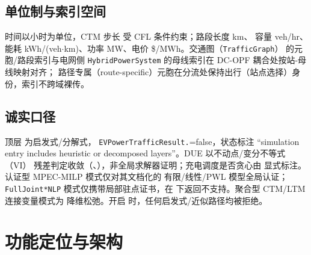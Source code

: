\documentclass[UTF8,fontset=fandol,a4paper,11pt]{ctexart}
\begin{document}
\subsection{单位制与索引空间}
时间以小时为单位，CTM 步长  受 CFL 条件约束；路段长度 km、
容量 veh/hr、能耗 kWh/(veh$\cdot$km)、功率 MW、电价 \$/MWh。交通图（\texttt{TrafficGraph}）
的元胞/路段索引与电网侧 \texttt{HybridPowerSystem} 的母线索引在 DC-OPF 耦合处按站-母线映射对齐；
路径专属（route-specific）元胞在分流处保持出行（站点选择）身份，索引不跨域裸传。

\subsection{诚实口径}
顶层  为启发式/分解式，
\texttt{EVPowerTrafficResult.}=false，状态标注
“simulation entry includes heuristic or decomposed layers”。DUE 以不动点/变分不等式（VI）
残差判定收敛（、），非全局求解器证明；充电调度是否贪心由
 显式标注。认证型 MPEC-MILP 模式仅对其文档化的
有限/线性/PWL 模型全局认证；\texttt{FullJoint*NLP} 模式仅携带局部驻点证书，在
 下返回不支持。聚合型 CTM/LTM 连接变量模式为
降维松弛。开启  时，任何启发式/近似路径均被拒绝。

\section{功能定位与架构}
\end{document}
